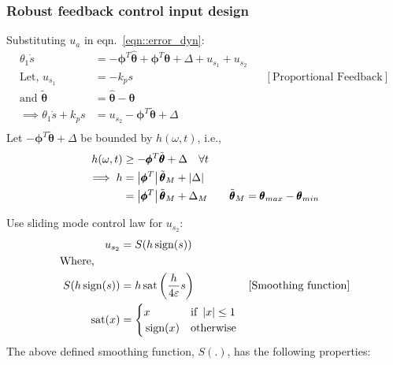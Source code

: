 
\subsubsection{Robust feedback control input design}
Substituting $u_a$ in eqn.~\ref{eqn::error_dyn}:
\begin{align*}
    \theta_1 \dot s &= -\pmb \phi^T \hat{\pmb \theta} + \pmb \phi^T \pmb \theta + \Delta + u_{s_1} + u_{s_2}\\
    \text{Let,  } u_{s_1} &= -k_p s & & [\text{Proportional Feedback}]\\
    \text{and  } \tilde{\pmb\theta} &= \hat{\pmb \theta} - \pmb \theta\\
    \implies \theta_1 \dot s + k_p s &= u_{s_2} - \pmb \phi^T \tilde{\pmb \theta} + \Delta\\
\end{align*}
Let $- \pmb \phi^T \tilde{\pmb \theta} + \Delta$ be bounded by $h(\omega, t)$,
i.e.,
\begin{align*}
    h(\omega, t) &\geq   - \pmb \phi^T \tilde{\pmb \theta} + \Delta  \quad \forall t\\
    \implies h &= \left\lvert \pmb \phi^T \right\rvert \tilde{\pmb \theta}_M + \left\lvert \Delta \right\rvert\\
               &= \left\lvert \pmb \phi^T \right\rvert \tilde{\pmb \theta}_M + \Delta_M \qquad
                \tilde{\pmb \theta}_M = \pmb \theta_{max} - \pmb \theta_{min}\\
\end{align*}

Use sliding mode control law for $u_{s_2}$:
\begin{align*}
    u_{s_2} &= S(h \,\text{sign}(s))\\
    \text{Where,  } \qquad &\\
    S(h \,\text{sign}(s)) &= h \,\text{sat} \left(  \frac{h}{4 \varepsilon} s \right) &[\text{Smoothing function}]\\
    \,\text{sat} (x) &= \begin{cases}
        x  & \text{if  } \left\lvert x \right\rvert \leq   1\\
        \,\text{sign}(x) &  \text{otherwise}
    \end{cases}
\end{align*}
The above defined smoothing function, $S(.)$, has the following properties:

